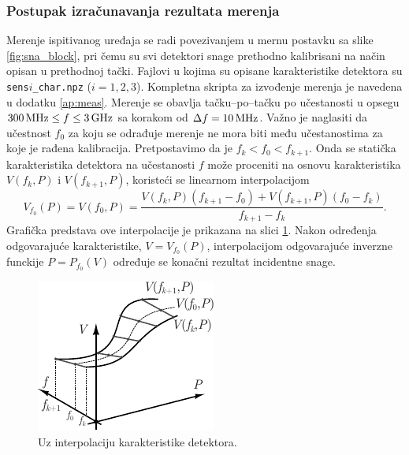 \documentclass[a4paper, 12pt, diplomski]{etf}
\renewcommand{\unit}[1]{\,{\rm #1}}   %
\begin{document}
\subsubsection{Postupak izračunavanja 
rezultata merenja}

Merenje ispitivanog uređaja se radi povezivanjem
u mernu postavku sa slike \ref{fig:sna_block},
pri čemu su svi detektori snage prethodno
kalibrisani na način opisan u prethodnoj tački.
Fajlovi u kojima su opisane karakteristike 
detektora su \verb|sens|$i$\verb|_char.npz| 
($i = 1,2,3$). Kompletna skripta za izvođenje
merenja je navedena u dodatku \ref{ap:meas}. 
Merenje se obavlja tačku--po--tačku po učestanosti u opsegu
$300\unit{MHz} \leq f \leq 3\unit{GHz}$ sa korakom od $\Delta f = 10\unit{MHz}$. Važno je naglasiti da učestnost $f_0$
za koju se odrađuje merenje ne mora biti među učestanostima za koje
je rađena kalibracija. Pretpostavimo da je $f_{k} < f_0 < f_{k+1}$.
Onda se statička karakteristika detektora na učestanosti $f$ može 
proceniti na osnovu karakteristika $V(f_k, P)$ i $V(f_{k+1}, P)$,
koristeći se linearnom interpolacijom
\begin{equation}
    V_{f_0}(P) = V(f_0, P) = \dfrac{ V(f_k, P)(f_{k+1} - f_0) + 
    V(f_{k+1}, P)(f_{0} - f_k)  }{f_{k+1} - f_k}.
\end{equation}
Grafička predstava ove interpolacije je prikazana na slici
\ref{fig:interp}.
Nakon određenja odgovarajuće karakteristike, $V = V_{f_0}(P)$, 
interpolacijom odgovarajuće inverzne funckije $P = P_{f_0}(V)$
određuje se konačni rezultat incidentne snage.

\begin{figure}[ht!]
    \centering
    \includegraphics[scale=1.4
    ]{fig/3dinterp.pdf}
    \caption{Uz interpolaciju karakteristike detektora.}
    \label{fig:interp}
\end{figure}
\end{document}
